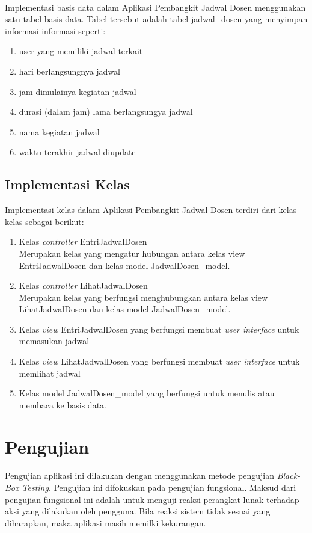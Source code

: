 \paragraph{}Implementasi basis data dalam Aplikasi Pembangkit Jadwal Dosen menggunakan satu tabel basis data. Tabel tersebut adalah tabel jadwal\_dosen yang menyimpan informasi-informasi seperti:
\begin{enumerate}
	\item user yang memiliki jadwal terkait
	\item hari berlangsungnya jadwal
	\item jam dimulainya kegiatan jadwal 
	\item durasi (dalam jam) lama berlangsungya jadwal
	\item nama kegiatan jadwal
	\item waktu terakhir jadwal diupdate
\end{enumerate}

\subsection{Implementasi Kelas}
Implementasi kelas dalam Aplikasi Pembangkit Jadwal Dosen terdiri dari kelas - kelas sebagai berikut:
\begin{enumerate}
	\item Kelas \textit{controller} EntriJadwalDosen\\
	Merupakan kelas yang mengatur hubungan antara kelas view EntriJadwalDosen dan kelas model JadwalDosen\_model.
	\item Kelas \textit{controller} LihatJadwalDosen\\
	Merupakan kelas yang berfungsi menghubungkan antara kelas view LihatJadwalDosen dan kelas model JadwalDosen\_model.
	\item Kelas \textit{view} EntriJadwalDosen yang berfungsi membuat \textit{user interface} untuk memasukan jadwal
	\item Kelas \textit{view} LihatJadwalDosen yang berfungsi membuat \textit{user interface} untuk memlihat jadwal
	\item Kelas model JadwalDosen\_model yang berfungsi untuk menulis atau membaca ke basis data.
\end{enumerate}

\section{Pengujian}
\paragraph{} Pengujian aplikasi ini dilakukan dengan menggunakan metode pengujian \textit{Black-Box Testing}. Pengujian ini difokuskan pada pengujian fungsional. Maksud dari pengujian fungsional ini adalah untuk menguji reaksi perangkat lunak terhadap aksi yang dilakukan oleh pengguna. Bila reaksi sistem tidak sesuai yang diharapkan, maka aplikasi masih memilki kekurangan.

